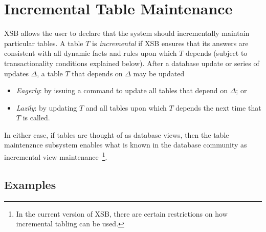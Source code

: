 \section{Incremental Table Maintenance} \label{sec:incremental_tabling}


XSB allows the user to declare that the system should incrementally
maintain particular tables.  A table $T$ is {\em incremental} if XSB
ensures that its answers are consistent with all dynamic facts and
rules upon which $T$ depends (subject to transactionality conditions
explained below).  After a database update or series of updates
$\Delta$, a table $T$ that depends on $\Delta$ may be updated
\begin{itemize}
\item {\em Eagerly}: by issuing a command to update all tables that
  depend on $\Delta$; or
%
\item {\em Lazily}: by updating $T$ and all tables upon which $T$
  depends the next time that $T$ is called.
\end{itemize}
%
In either case, if tables are thought of as database views, then the
table maintenznce subsystem enables what is known in the database
community as incremental view maintenance~\footnote{In the current
  version of XSB, there are certain restrictions on how incremental
  tabling can be used.}.

\subsection{Examples} \label{sec:incr_examples}

